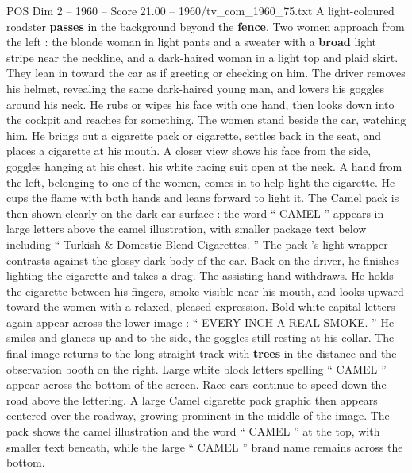 \begin{textsample}{POS Dim 2 – 1960 – Score 21.00 – 1960/tv\_com\_1960\_75.txt}
A light-coloured roadster \textbf{passes} in the background beyond the \textbf{fence}.
Two women approach from the left : the blonde woman in light pants and a sweater with a \textbf{broad} light stripe near the neckline, and a dark-haired woman in a light top and plaid skirt.
They lean in toward the car as if greeting or checking on him.
The driver removes his helmet, revealing the same dark-haired young man, and lowers his goggles around his neck.
He rubs or wipes his face with one hand, then looks down into the cockpit and reaches for something.
The women stand beside the car, watching him.
He brings out a cigarette pack or cigarette, settles back in the seat, and places a cigarette at his mouth.
A closer view shows his face from the side, goggles hanging at his chest, his white racing suit open at the neck.
A hand from the left, belonging to one of the women, comes in to help light the cigarette.
He cups the flame with both hands and leans forward to light it.
The Camel pack is then shown clearly on the dark car surface : the word “ CAMEL ” appears in large letters above the camel illustration, with smaller package text below including “ Turkish \& Domestic Blend Cigarettes. ” The pack ’s light wrapper contrasts against the glossy dark body of the car.
Back on the driver, he finishes lighting the cigarette and takes a drag.
The assisting hand withdraws.
He holds the cigarette between his fingers, smoke visible near his mouth, and looks upward toward the women with a relaxed, pleased expression.
Bold white capital letters again appear across the lower image : “ EVERY INCH A REAL SMOKE. ” He smiles and glances up and to the side, the goggles still resting at his collar.
The final image returns to the long straight track with \textbf{trees} in the distance and the observation booth on the right.
Large white block letters spelling “ CAMEL ” appear across the bottom of the screen.
Race cars continue to speed down the road above the lettering.
A large Camel cigarette pack graphic then appears centered over the roadway, growing prominent in the middle of the image.
The pack shows the camel illustration and the word “ CAMEL ” at the top, with smaller text beneath, while the large “ CAMEL ” brand name remains across the bottom.

\end{textsample}
